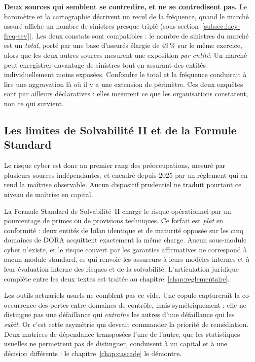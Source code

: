 \begin{attention}
\textbf{Deux sources qui semblent se contredire, et ne se contredisent pas.} Le baromètre et la
cartographie décrivent un recul de la fréquence, quand le marché assuré affiche un nombre de
sinistres presque triplé (sous-section~\ref{subsec:lucy-freq-sev}). Les deux constats sont
compatibles : le nombre de sinistres du marché est un \emph{total}, porté par une base d'assurés
élargie de $49\,\%$ sur le même exercice, alors que les deux autres sources mesurent une
exposition \emph{par entité}. Un marché peut enregistrer davantage de sinistres tout en assurant
des entités individuellement moins exposées. Confondre le total et la fréquence conduirait à lire
une aggravation là où il y a une extension de périmètre. Ces deux enquêtes sont par ailleurs
déclaratives : elles mesurent ce que les organisations constatent, non ce qui survient.
\end{attention}

\subsection{Les limites de Solvabilité II et de la Formule Standard}
\label{subsec:limites-formule-standard}

Le risque cyber est donc au premier rang des préoccupations, mesuré par plusieurs sources
indépendantes, et encadré depuis $2025$ par un règlement qui en rend la maîtrise observable.
Aucun dispositif prudentiel ne traduit pourtant ce niveau de maîtrise en capital.

La Formule Standard de Solvabilité~II charge le risque opérationnel par un pourcentage de primes
ou de provisions techniques. Ce forfait est \emph{plat} en conformité : deux entités de bilan
identique et de maturité opposée sur les cinq domaines de DORA acquittent exactement la même
charge. Aucun sous-module cyber n'existe, et le risque couvert par les garanties affirmatives ne
correspond à aucun module standard, ce qui renvoie les assureurs à leurs modèles internes et à
leur évaluation interne des risques et de la solvabilité. L'articulation juridique complète entre
les deux textes est traitée au chapitre~\ref{chap:reglementaire}.

Les outils actuariels usuels ne comblent pas ce vide. Une copule capturerait la co-occurrence des
pertes entre domaines de contrôle, mais symétriquement : elle ne distingue pas une défaillance
qui \emph{entraîne} les autres d'une défaillance qui les \emph{subit}. Or c'est cette asymétrie
qui devrait commander la priorité de remédiation. Deux matrices de dépendance transposées l'une
de l'autre, que les statistiques usuelles ne permettent pas de distinguer, conduisent à un
capital et à une décision différents : le chapitre~\ref{chap:cascade} le démontre.

